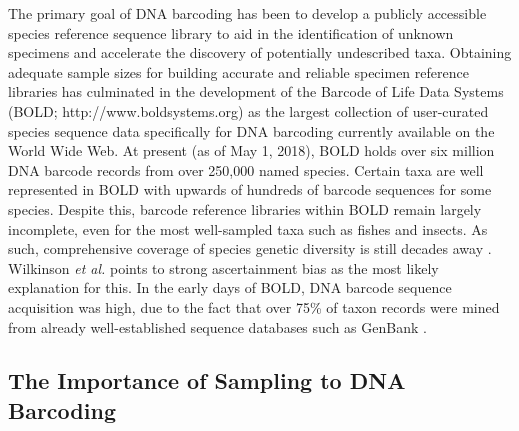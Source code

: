 \vspace{5mm}

The primary goal of DNA barcoding has been to develop a publicly accessible species reference sequence library to aid in the identification of unknown specimens and accelerate the discovery of potentially undescribed taxa. Obtaining adequate sample sizes for building accurate and reliable specimen reference libraries has culminated in the development of the Barcode of Life Data Systems (BOLD; http://www.boldsystems.org) \cite{ratnasingham2007bold} as the largest collection of user-curated species sequence data specifically for DNA barcoding currently available on the World Wide Web. At present (as of May 1, 2018), BOLD holds over six million DNA barcode records from over 250,000 named species. Certain taxa are well represented in BOLD with upwards of hundreds of barcode sequences for some species. Despite this, barcode reference libraries within BOLD remain largely incomplete, even for the most well-sampled taxa such as fishes and insects. As such, comprehensive coverage of species genetic diversity is still decades away \cite{wilkinson2017replacing}. Wilkinson \textit{et al.} \cite{wilkinson2017replacing} points to strong ascertainment bias as the most likely explanation for this. In the early days of BOLD, DNA barcode sequence acquisition was high, due to the fact that over 75\% of taxon records were mined from already well-established sequence databases such as GenBank \cite{wilkinson2017replacing}.

\vspace{5mm} 

\subsection{The Importance of Sampling to DNA Barcoding}

